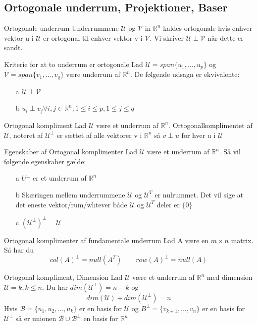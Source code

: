 \documentclass[a4paper,fleqn]{article}
\newcommand{\RR}{\mathbb{R}}
\newcommand{\U}{\mathcal{U}}
\newcommand{\V}{\mathcal{V}}
\newcommand{\B}{\mathcal{B}}
\begin{document}
	\subsection{Ortogonale underrum, Projektioner, Baser}
	\begin{definition}{Ortogonale underrum}{}
		Underrummene $\U$ og $\V$ in $\RR^n$ kaldes ortogonale hvis enhver vektor u i $\U$
		er ortogonal til enhver vektor v i $\V$. Vi skriver $\U\perp\V$ når dette er sandt.
	\end{definition}
	\begin{theorem}{Kriterie for at to underrum er ortogonale}{}
		Lad $\U = span\{u_1,\dots,u_p\}$ og $\V = span\{v_1,\dots,v_q\}$ være underrum af
		$\RR^n$. De følgende udsagn er ekvivalente:
		\begin{itemize}
			\item[a] $\U \perp \V$
			\item[b] $u_i \perp v_j \forall i,j \in \RR^n; 1 \leq i \leq p, 1 \leq j
				\leq q$
		\end{itemize}
	\end{theorem}
	\begin{definition}{Ortogonal kompliment}{}
		Lad $\U$ være et underrum af $\RR^n$. Ortogonalkomplimentet af $\U$, noteret af
		$\U^\perp$ er sættet af alle vektorer v i $\RR^n$ så $v \perp u$ for hver u i $\U$
	\end{definition}
	\begin{theorem}{Egenskaber af Ortogonal komplimenter}{}
		Lad $\U$ være et underrum af $\RR^n$. Så vil følgende egenskaber gælde:
		\begin{itemize}
			\item[a] $U^\perp$ er et underrum af $\RR^n$
			\item[b] Skæringen mellem underrummene $\U$ og $\U^T$ er nulrummet.
				Det vil sige at det eneste vektor/rum/whtever både $\U$ og $\U^T$ 
				deler er $\{0\}$
			\item[c] $(\U^\perp)^\perp = \U$
		\end{itemize}
	\end{theorem}
	\begin{theorem}{Ortogonal komplimenter af fundamentale underrum}{}
		Lad A være en $m\times n$ matrix. Så har du
		\[ col(A)^\perp = null(A^T) \qquad row(A)^\perp = null(A)\]
	\end{theorem}
	\begin{theorem}{Ortogonal kompliment, Dimension}{}
		Lad $\U$ være et underrum af $\RR^n$ med dimension $\U = k, k \leq n$. Du har
		$dim(\U^\perp) = n-k$ og
		\[ dim(\U) + dim(\U^\perp) = n\]
		Hvis $\B = \{u_1, u_2, \dots, u_k\}$ er en basis for $\U$ og $B^\perp = \{v_{k+1},
		\dots, v_n\}$ er en basis for $\U^\perp$ så er unionen $\B \cup \B^\perp$ en basis
		for $\RR^n$
	\end{theorem}
\end{document}
